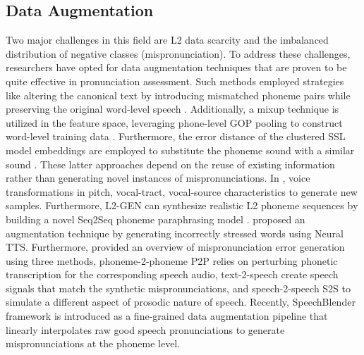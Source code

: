 \documentclass[11pt]{article}
\begin{document}
\subsection{Data Augmentation}
Two major challenges in this field are L2 data scarcity and the imbalanced distribution of negative classes (mispronunciation).
To address these challenges, researchers have opted for  
data augmentation techniques that are proven to be quite effective in pronunciation assessment. Such methods employed strategies like altering the canonical text by introducing mismatched phoneme pairs while preserving the original word-level speech \cite{text-aug}. Additionally, a mixup technique is utilized in the feature space, leveraging phone-level GOP pooling to construct word-level training data \cite{mixup}. Furthermore, the error distance of the clustered SSL model embeddings are employed to substitute the phoneme sound with a similar sound \cite{ssl}. These latter approaches depend on the reuse of existing information rather than generating novel instances of mispronunciations. In \cite{7953214}, voice transformations in pitch, vocal-tract, vocal-source characteristics to generate new samples. Furthermore, L2-GEN can synthesize realistic L2 phoneme sequences by building a novel Seq2Seq phoneme paraphrasing model \cite{zhang2022l2}. \citet{Korzekwa2020DetectionOL} proposed an augmentation technique by generating incorrectly stressed words using Neural TTS. 
Furthermore, \citet{korzekwa2022computer} provided an overview of mispronunciation error generation using three methods, phoneme-2-phoneme P2P relies on perturbing phonetic transcription for the corresponding speech audio, text-2-speech create speech signals that match the synthetic mispronunciations, and speech-2-speech S2S to simulate a different aspect of prosodic nature of speech. Recently, SpeechBlender \cite{speechblender} framework is introduced as a fine-grained data augmentation pipeline that linearly interpolates raw good speech pronunciations to generate mispronunciations at the phoneme level.


\end{document}
